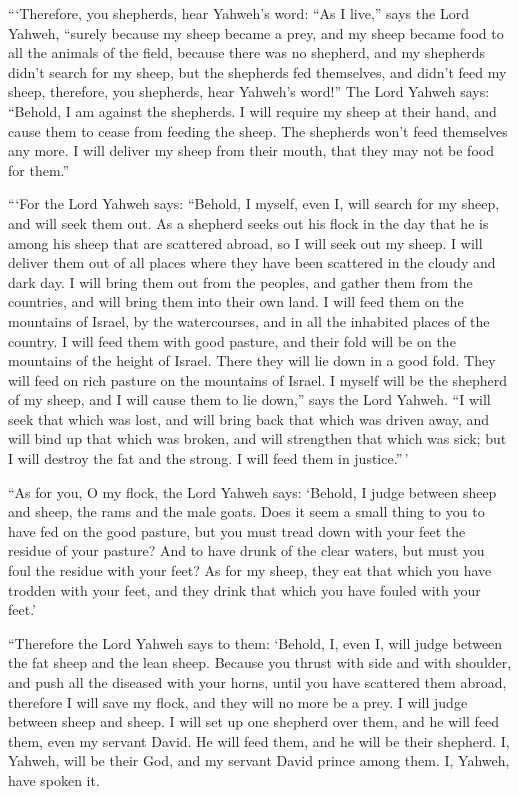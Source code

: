  ```Therefore, you shepherds, hear Yahweh's word:
 ``As I live,'' says the Lord Yahweh, ``surely because my
sheep became a prey, and my sheep became food to all the animals of the
field, because there was no shepherd, and my shepherds didn't search for
my sheep, but the shepherds fed themselves, and didn't feed my sheep,
 therefore, you shepherds, hear Yahweh's word!''
 The Lord Yahweh says: ``Behold, I am against the
shepherds. I will require my sheep at their hand, and cause them to
cease from feeding the sheep. The shepherds won't feed themselves any
more. I will deliver my sheep from their mouth, that they may not be
food for them.''

 ```For the Lord Yahweh says: ``Behold, I myself, even I,
will search for my sheep, and will seek them out.  As a
shepherd seeks out his flock in the day that he is among his sheep that
are scattered abroad, so I will seek out my sheep. I will deliver them
out of all places where they have been scattered in the cloudy and dark
day.  I will bring them out from the peoples, and gather
them from the countries, and will bring them into their own land. I will
feed them on the mountains of Israel, by the watercourses, and in all
the inhabited places of the country.  I will feed them with
good pasture, and their fold will be on the mountains of the height of
Israel. There they will lie down in a good fold. They will feed on rich
pasture on the mountains of Israel.  I myself will be the
shepherd of my sheep, and I will cause them to lie down,'' says the Lord
Yahweh.  ``I will seek that which was lost, and will bring
back that which was driven away, and will bind up that which was broken,
and will strengthen that which was sick; but I will destroy the fat and
the strong. I will feed them in justice.''\,'

 ``As for you, O my flock, the Lord Yahweh says: `Behold, I
judge between sheep and sheep, the rams and the male goats.
 Does it seem a small thing to you to have fed on the good
pasture, but you must tread down with your feet the residue of your
pasture? And to have drunk of the clear waters, but must you foul the
residue with your feet?  As for my sheep, they eat that
which you have trodden with your feet, and they drink that which you
have fouled with your feet.'

 ``Therefore the Lord Yahweh says to them: `Behold, I, even
I, will judge between the fat sheep and the lean sheep. 
Because you thrust with side and with shoulder, and push all the
diseased with your horns, until you have scattered them abroad,
 therefore I will save my flock, and they will no more be a
prey. I will judge between sheep and sheep.  I will set up
one shepherd over them, and he will feed them, even my servant David. He
will feed them, and he will be their shepherd.  I, Yahweh,
will be their God, and my servant David prince among them. I, Yahweh,
have spoken it.

